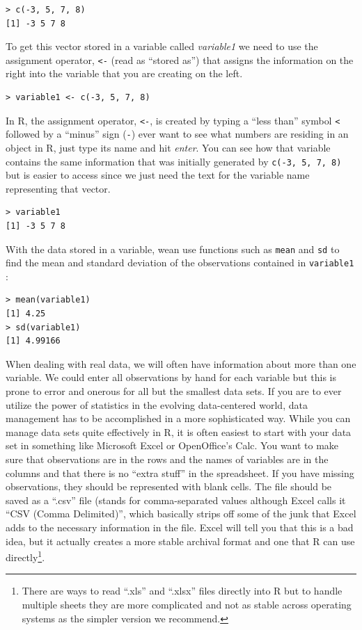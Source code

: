 \documentclass[]{article}
\let\rmarkdownfootnote\footnote%
\def\footnote{\protect\rmarkdownfootnote}
\begin{document}
\begin{verbatim}
> c(-3, 5, 7, 8)
[1] -3 5 7 8
\end{verbatim}

To get this vector stored in a variable called \emph{variable1} we need
to use the assignment operator, \texttt{\textless{}-} (read as ``stored
as'') that assigns the information on the right into the variable that
you are creating on the left.

\begin{verbatim}
> variable1 <- c(-3, 5, 7, 8)
\end{verbatim}

In R, the assignment operator, \texttt{\textless{}-}, is created by
typing a ``less than'' symbol \texttt{\textless{}} followed by a
``minus'' sign (\texttt{-}) ever want to see what numbers are residing
in an object in R, just type its name and hit \emph{enter}. You can see
how that variable contains the same information that was initially
generated by \texttt{c(-3,\ 5,\ 7,\ 8)} but is easier to access since we
just need the text for the variable name representing that vector.

\begin{verbatim}
> variable1
[1] -3 5 7 8
\end{verbatim}

With the data stored in a variable, wean use functions such as
\texttt{mean} and \texttt{sd} to find the mean and standard deviation of
the observations contained in \texttt{variable1} :

\begin{verbatim}
> mean(variable1)
[1] 4.25
> sd(variable1)
[1] 4.99166
\end{verbatim}

When dealing with real data, we will often have information about more
than one variable. We could enter all observations by hand for each
variable but this is prone to error and onerous for all but the smallest
data sets. If you are to ever utilize the power of statistics in the
evolving data-centered world, data management has to be accomplished in
a more sophisticated way. While you can manage data sets quite
effectively in R, it is often easiest to start with your data set in
something like Microsoft Excel or OpenOffice's Calc. You want to make
sure that observations are in the rows and the names of variables are in
the columns and that there is no ``extra stuff'' in the spreadsheet. If
you have missing observations, they should be represented with blank
cells. The file should be saved as a ``.csv'' file (stands for
comma-separated values although Excel calls it ``CSV (Comma
Delimited)'', which basically strips off some of the junk that Excel
adds to the necessary information in the file. Excel will tell you that
this is a bad idea, but it actually creates a more stable archival
format and one that R can use directly\footnote{There are ways to read
  ``.xls'' and ``.xlsx'' files directly into R but to handle multiple
  sheets they are more complicated and not as stable across operating
  systems as the simpler version we recommend.}.
\end{document}
